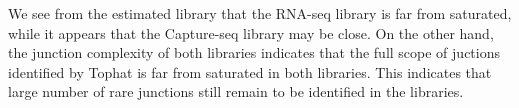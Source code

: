 \documentclass[11pt, titlepage]{article}
\begin{document}
We see from the estimated library that the RNA-seq library is far
from saturated, while it appears that the Capture-seq library
may be close.  On the other hand, the junction complexity of
both libraries indicates that the full scope of juctions identified
by Tophat is far from saturated in both libraries.  This indicates
that large number of rare junctions still remain to be identified
in the libraries.

\end{document}
